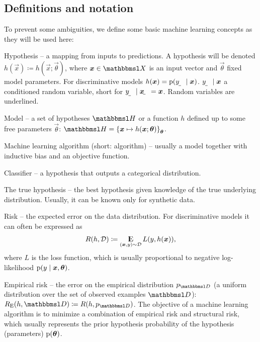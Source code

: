 \documentclass[twocolumn]{article}
\begin{document}
\subsection{Definitions and notation}

To prevent some ambiguities, we define some basic machine learning concepts as they will be used here:
\begin{soliditemize}
	\item Hypothesis -- a mapping from inputs to predictions. A hypothesis will be denoted $h(\vec x)\coloneqq h(\vec x;\vec\theta)$, where $\vec x\in\set X$ is an input vector and $\vec\theta$ fixed model parameters. For discriminative models $h(\vec x)=\p(\rvar y\mid\vec x)$. $\rvar y\mid\vec x$ a conditioned random variable, short for $\rvar y\mid\rvec x=\vec x$. Random variables are underlined.
	\item Model -- a set of hypotheses $\set H$ or a function $h$ defined up to some free parameters $\vec\theta$: $\set H=\cbr{\vec x\mapsto h(\vec x;\vec\theta)}_{\vec\theta}$.
	\item Machine learning algorithm (short: algorithm) -- usually a model together with inductive bias and an objective function. %
	\item Classifier -- a hypothesis that outputs a categorical distribution.
	\item The true hypothesis -- the best hypothesis given knowledge of the true underlying distribution. Usually, it can be known only for synthetic data.
	\item Risk -- the expected error on the data distribution. For discriminative models it can often be expressed as
	\begin{align}
		R(h,\distrib D)\coloneqq\E_{(\vec x,y)\sim\distrib D}L(y, h(\vec x)) \text{,}
	\end{align} where $L$ is the loss function, which is usually proportional to negative log-likelihood $\p(y\mid\vec x,\vec\theta)$.
	\item Empirical risk -- the error on the empirical distribution $p_{\set D}$ (a uniform distribution over the set of observed examples $\set D$): $R_\text{E}(h,\set D)\coloneqq R(h,p_{\set D})$. The objective of a machine learning algorithm is to minimize a combination of empirical risk and structural risk, which usually represents the prior hypothesis probability of the hypothesis (parameters) $\p(\vec\theta)$.
\end{soliditemize}
\end{document}

